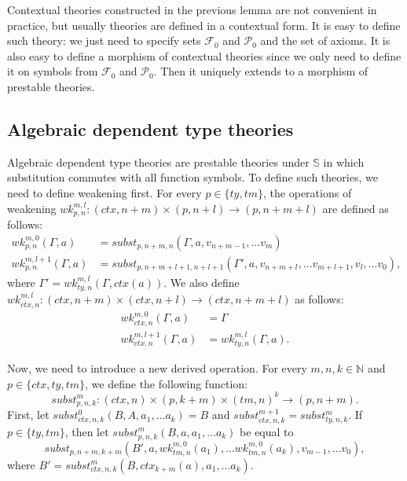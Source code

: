 \documentclass[reqno]{amsart}
\theoremstyle{definition}
\theoremstyle{remark}
\newcommand{\substTh}{\mathbb{S}}
\numberwithin{figure}{section}
\begin{document}
Contextual theories constructed in the previous lemma are not convenient in practice, but usually theories are defined in a contextual form.
It is easy to define such theory: we just need to specify sets $\mathcal{F}_0$ and $\mathcal{P}_0$ and the set of axioms.
It is also easy to define a morphism of contextual theories since we only need to define it on symbols from $\mathcal{F}_0$ and $\mathcal{P}_0$.
Then it uniquely extends to a morphism of prestable theories.

\subsection{Algebraic dependent type theories}

Algebraic dependent type theories are prestable theories under $\substTh$ in which substitution commutes with all function symbols.
To define such theories, we need to define weakening first.
For every $p \in \{ty,tm\}$, the operations of weakening $wk^{m,l}_{p,n} : (ctx,n+m) \times (p,n+l) \to (p,n+m+l)$ are defined as follows:
\begin{align*}
wk^{m,0}_{p,n}(\Gamma,a) & = subst_{p,n+m,n}(\Gamma, a, v_{n+m-1}, \ldots v_m) \\
wk^{m,l+1}_{p,n}(\Gamma,a) & = subst_{p,n+m+l+1,n+l+1}(\Gamma', a, v_{n+m+l}, \ldots v_{m+l+1}, v_l, \ldots v_0),
\end{align*}
where $\Gamma' = wk^{m,l}_{ty,n}(\Gamma,ctx(a))$.
We also define $wk^{m,l}_{ctx,n} : (ctx,n+m) \times (ctx,n+l) \to (ctx,n+m+l)$ as follows:
\begin{align*}
wk^{m,0}_{ctx,n}(\Gamma,a) & = \Gamma \\
wk^{m,l+1}_{ctx,n}(\Gamma,a) & = wk^{m,l}_{ty,n}(\Gamma,a).
\end{align*}

Now, we need to introduce a new derived operation.
For every $m,n,k \in \mathbb{N}$ and $p \in \{ ctx, ty, tm \}$, we define the following function:
\[ subst^m_{p,n,k} : (ctx,n) \times (p,k+m) \times (tm,n)^k \to (p,n+m). \]
First, let $subst^0_{ctx,n,k}(B, A, a_1, \ldots a_k) = B$ and $subst^{m+1}_{ctx,n,k} = subst^m_{ty,n,k}$.
If $p \in \{ ty, tm \}$, then let $subst^m_{p,n,k}(B, a, a_1, \ldots a_k)$ be equal to
\[ subst_{p,n+m,k+m}(B', a, wk^{m,0}_{tm,n}(a_1), \ldots wk^{m,0}_{tm,n}(a_k), v_{m-1}, \ldots v_0), \]
where $B' = subst^m_{ctx,n,k}(B, ctx_{k+m}(a), a_1, \ldots a_k)$.
\end{document}
